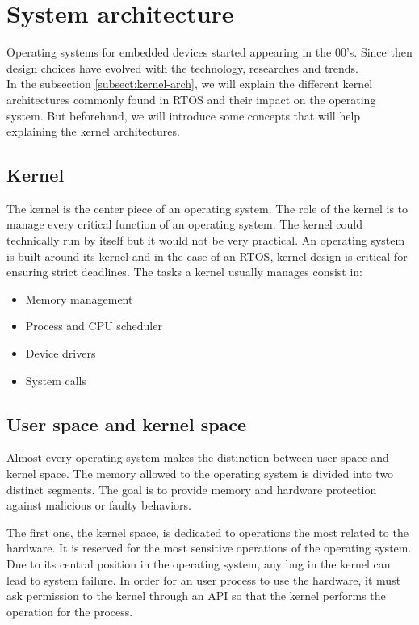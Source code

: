 \section{System architecture}

Operating systems for embedded devices started appearing in the 00's.
Since then design choices have evolved with the technology, researches and trends.
\\
In the subsection \ref{subsect:kernel-arch}, we will explain the different kernel architectures commonly found in RTOS and their impact on the operating system.
But beforehand, we will introduce some concepts that will help explaining the kernel architectures.

\subsection{Kernel}
The kernel is the center piece of an operating system.
The role of the kernel is to manage every critical function of an operating system.
The kernel could technically run by itself but it would not be very practical.
An operating system is built around its kernel and in the case of an RTOS, kernel design is critical for ensuring strict deadlines.
The tasks a kernel usually manages consist in:
\begin{itemize}
    \item Memory management
    \item Process and CPU scheduler
    \item Device drivers
    \item System calls
\end{itemize}

\subsection{User space and kernel space}
Almost every operating system makes the distinction between user space and kernel space.
The memory allowed to the operating system is divided into two distinct segments.
The goal is to provide memory and hardware protection against malicious or faulty behaviors.

The first one, the kernel space, is dedicated to operations the most related to the hardware.
It is reserved for the most sensitive operations of the operating system.
Due to its central position in the operating system, any bug in the kernel can lead to system failure.
In order for an user process to use the hardware, it must ask permission to the kernel through an API so that the kernel performs the operation for the process.

